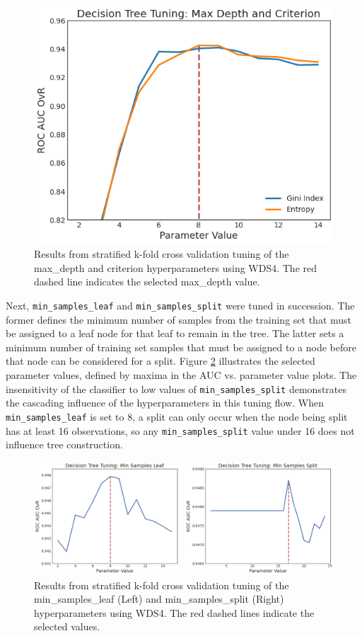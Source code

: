 \begin{figure}[!htp]
\centering
\includegraphics[width=.6\textwidth]{templates/images/Figure-DT_tuning_maxdepth_criterion.png}
\caption[Decision tree max depth tuning]{Results from stratified k-fold cross validation tuning of the max\_depth and criterion hyperparameters using WDS4. The red dashed line indicates the selected max\_depth value.}
\label{fig:dtree_maxdepth}
\end{figure}

Next, \verb|min_samples_leaf| and \verb|min_samples_split| were tuned in succession. The former defines the minimum number of samples from the training set that must be assigned to a leaf node for that leaf to remain in the tree. The latter sets a minimum number of training set samples that must be assigned to a node before that node can be considered for a split. Figure \ref{fig:dtree_min_samples} illustrates the selected parameter values, defined by maxima in the AUC vs. parameter value plots. The insensitivity of the classifier to low values of \verb|min_samples_split| demonstrates the cascading influence of the hyperparameters in this tuning flow. When \verb|min_samples_leaf| is set to 8, a split can only occur when the node being split has at least 16 observations, so any \verb|min_samples_split| value under 16 does not influence tree construction. 

\begin{figure}[!htp]
\centering
\includegraphics[width=\textwidth]{templates/images/Figure-DT_tuning_min_samp_leaf_split.png}
\caption[Decision tree min samples tuning]{Results from stratified k-fold cross validation tuning of the min\_samples\_leaf (Left) and min\_samples\_split (Right) hyperparameters using WDS4. The red dashed lines indicate the selected values.}
\label{fig:dtree_min_samples}
\end{figure}

